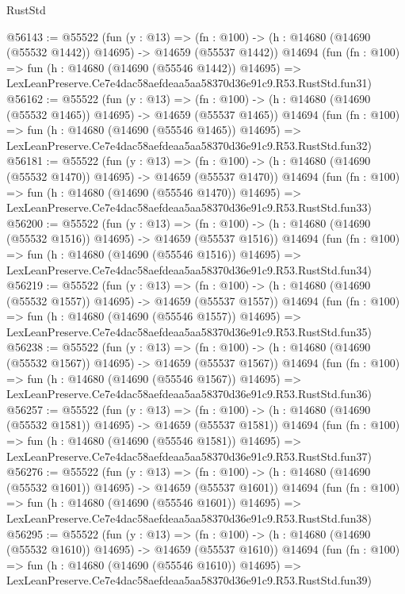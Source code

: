 \begin{lexlean}{RustStd}
\begin{coremodule}
@56143 := @55522
    (fun (y : @13) =>
    (fn : @100) -> (h : @14680 (@14690 (@55532 @1442)) @14695) -> @14659 (@55537 @1442))
    @14694
    (fun (fn : @100) =>
    fun (h : @14680 (@14690 (@55546 @1442)) @14695) =>
    LexLeanPreserve.Ce7e4dac58aefdeaa5aa58370d36e91c9.R53.RustStd.fun31)
@56162 := @55522
    (fun (y : @13) =>
    (fn : @100) -> (h : @14680 (@14690 (@55532 @1465)) @14695) -> @14659 (@55537 @1465))
    @14694
    (fun (fn : @100) =>
    fun (h : @14680 (@14690 (@55546 @1465)) @14695) =>
    LexLeanPreserve.Ce7e4dac58aefdeaa5aa58370d36e91c9.R53.RustStd.fun32)
@56181 := @55522
    (fun (y : @13) =>
    (fn : @100) -> (h : @14680 (@14690 (@55532 @1470)) @14695) -> @14659 (@55537 @1470))
    @14694
    (fun (fn : @100) =>
    fun (h : @14680 (@14690 (@55546 @1470)) @14695) =>
    LexLeanPreserve.Ce7e4dac58aefdeaa5aa58370d36e91c9.R53.RustStd.fun33)
@56200 := @55522
    (fun (y : @13) =>
    (fn : @100) -> (h : @14680 (@14690 (@55532 @1516)) @14695) -> @14659 (@55537 @1516))
    @14694
    (fun (fn : @100) =>
    fun (h : @14680 (@14690 (@55546 @1516)) @14695) =>
    LexLeanPreserve.Ce7e4dac58aefdeaa5aa58370d36e91c9.R53.RustStd.fun34)
@56219 := @55522
    (fun (y : @13) =>
    (fn : @100) -> (h : @14680 (@14690 (@55532 @1557)) @14695) -> @14659 (@55537 @1557))
    @14694
    (fun (fn : @100) =>
    fun (h : @14680 (@14690 (@55546 @1557)) @14695) =>
    LexLeanPreserve.Ce7e4dac58aefdeaa5aa58370d36e91c9.R53.RustStd.fun35)
@56238 := @55522
    (fun (y : @13) =>
    (fn : @100) -> (h : @14680 (@14690 (@55532 @1567)) @14695) -> @14659 (@55537 @1567))
    @14694
    (fun (fn : @100) =>
    fun (h : @14680 (@14690 (@55546 @1567)) @14695) =>
    LexLeanPreserve.Ce7e4dac58aefdeaa5aa58370d36e91c9.R53.RustStd.fun36)
@56257 := @55522
    (fun (y : @13) =>
    (fn : @100) -> (h : @14680 (@14690 (@55532 @1581)) @14695) -> @14659 (@55537 @1581))
    @14694
    (fun (fn : @100) =>
    fun (h : @14680 (@14690 (@55546 @1581)) @14695) =>
    LexLeanPreserve.Ce7e4dac58aefdeaa5aa58370d36e91c9.R53.RustStd.fun37)
@56276 := @55522
    (fun (y : @13) =>
    (fn : @100) -> (h : @14680 (@14690 (@55532 @1601)) @14695) -> @14659 (@55537 @1601))
    @14694
    (fun (fn : @100) =>
    fun (h : @14680 (@14690 (@55546 @1601)) @14695) =>
    LexLeanPreserve.Ce7e4dac58aefdeaa5aa58370d36e91c9.R53.RustStd.fun38)
@56295 := @55522
    (fun (y : @13) =>
    (fn : @100) -> (h : @14680 (@14690 (@55532 @1610)) @14695) -> @14659 (@55537 @1610))
    @14694
    (fun (fn : @100) =>
    fun (h : @14680 (@14690 (@55546 @1610)) @14695) =>
    LexLeanPreserve.Ce7e4dac58aefdeaa5aa58370d36e91c9.R53.RustStd.fun39)

\end{coremodule}
\end{lexlean}
